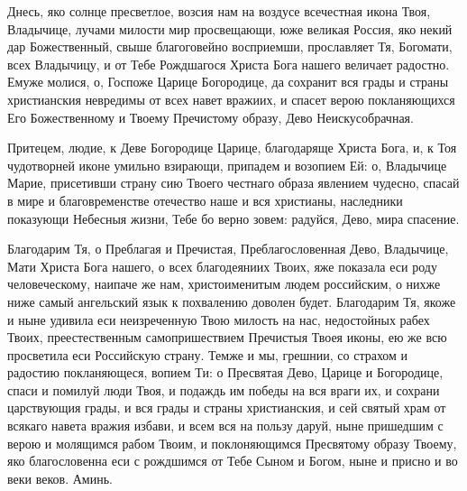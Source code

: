 \mychapterending

\begin{mymulticols}


Днесь, яко солнце пресветлое, возсия нам на воздусе всечестная икона Твоя, Владычице, лучами милости мир просвещающи, юже великая Россия, яко некий дар Божественный, свыше благоговейно восприемши, прославляет Тя, Богомати, всех Владычицу, и от Тебе Рождшагося Христа Бога нашего величает радостно. Емуже молися, о, Госпоже Царице Богородице, да сохранит вся грады и страны христианския невредимы от всех навет вражиих, и спасет верою покланяющихся Его Божественному и Твоему Пречистому образу, Дево Неискусобрачная.


Притецем, людие, к Деве Богородице Царице, благодаряще Христа Бога, и, к Тоя чудотворней иконе умильно взирающи, припадем и возопием Ей: о, Владычице Марие, присетивши страну сию Твоего честнаго образа явлением чудесно, спасай в мире и благовременстве отечество наше и вся христианы, наследники показующи Небесныя жизни, Тебе бо верно зовем: радуйся, Дево, мира спасение.


Благодарим Тя, о Преблагая и Пречистая, Преблагословенная Дево, Владычице, Мати Христа Бога нашего, о всех благодеяниих Твоих, яже показала еси роду человеческому, наипаче же нам, христоименитым людем российским, о нихже ниже самый ангельский язык к похвалению доволен будет. Благодарим Тя, якоже и ныне удивила еси неизреченную Твою милость на нас, недостойных рабех Твоих, преестественным самопришествием Пречистыя Твоея иконы, ею же всю просветила еси Российскую страну. Темже и мы, грешнии, со страхом и радостию покланяющеся, вопием Ти: о Пресвятая Дево, Царице и Богородице, спаси и помилуй люди Твоя, и подаждь им победы на вся враги их, и сохрани царствующия грады, и вся грады и страны христианския, и сей святый храм от всякаго навета вражия избави, и всем вся на пользу даруй, ныне пришедшим с верою и молящимся рабом Твоим, и поклоняющимся Пресвятому образу Твоему, яко благословенна еси с рождшимся от Тебе Сыном и Богом, ныне и присно и во веки веков. Аминь.

\end{mymulticols}

\mychapterending

